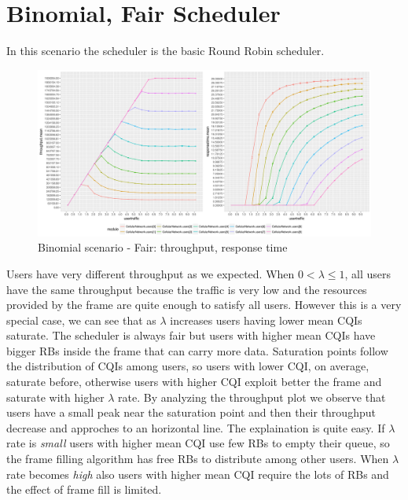 \section{Binomial, Fair Scheduler}
In this scenario the scheduler is the basic Round Robin scheduler.

\begin{figure}[H]
  \includegraphics[width=1\textwidth]{images/binom}
  \caption{Binomial scenario - Fair: throughput, response time}
  \label{fig:Binomial scenario - Fair: throughput, response time}
\end{figure}
Users have very different throughput as we expected. When \( 0 < \lambda \leq 1\), all users have the same throughput because the traffic is very low and the resources provided by the frame are quite enough to satisfy all users. However this is a very special case, we can see that as \(\lambda\) increases users having lower mean CQIs saturate. The scheduler is always fair but users with higher mean CQIs have bigger RBs inside the frame that can carry more data. Saturation points follow the distribution of CQIs among users, so users with lower CQI, on average, saturate before, otherwise users with higher CQI exploit better the frame and saturate with higher \(\lambda\) rate. 
By analyzing the throughput plot we observe that users have a small peak near the saturation point and then their throughput decrease and approches to an horizontal line. The explaination is quite easy. If \(\lambda\) rate is \textit{small} users with higher mean CQI use few RBs to empty their queue, so the frame filling algorithm has free RBs to distribute among other users. When \(\lambda\) rate becomes \textit{high} also users with higher mean CQI require the lots of RBs and the effect of frame fill is limited. 

